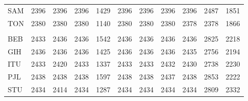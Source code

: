 \documentclass[twoside,openright]{report}
\begin{document}
\begin{table}
{\begin{tabular}[t]{lrrrrrrrrrr}
\hspace{1em}SAM & 2396 & 2396 & 2396 & 1429 & 2396 & 2396 & 2396 & 2396 & 2487 & 1851\\
\hspace{1em}TON & 2380 & 2380 & 2380 & 1140 & 2380 & 2380 & 2380 & 2378 & 2378 & 1866\\
\addlinespace[0.3em]
\multicolumn{11}{l}{\textbf{SAS}}\\
\hspace{1em}BEB & 2433 & 2436 & 2436 & 1542 & 2436 & 2436 & 2436 & 2436 & 2825 & 2218\\
\hspace{1em}GIH & 2436 & 2436 & 2436 & 1425 & 2436 & 2436 & 2436 & 2435 & 2756 & 2194\\
\hspace{1em}ITU & 2433 & 2420 & 2433 & 1337 & 2433 & 2433 & 2432 & 2430 & 2738 & 2230\\
\hspace{1em}PJL & 2438 & 2438 & 2438 & 1597 & 2438 & 2438 & 2437 & 2438 & 2853 & 2222\\
\hspace{1em}STU & 2434 & 2414 & 2434 & 1287 & 2434 & 2434 & 2434 & 2434 & 2809 & 2332\\
\bottomrule
\end{tabular}}
\end{table}
\end{document}

